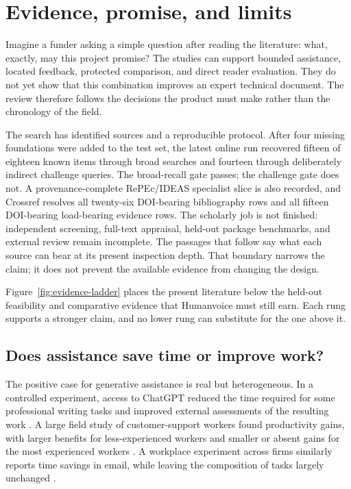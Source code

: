\chapter{Evidence, promise, and limits}
\label{ch:evidence}

Imagine a funder asking a simple question after reading the literature: what,
exactly, may this project promise? The studies can support bounded assistance,
located feedback, protected comparison, and direct reader evaluation. They do
not yet show that this combination improves an expert technical document. The
review therefore follows the decisions the product must make rather than the
chronology of the field.

The search has identified sources and a reproducible protocol. After four
missing foundations were added to the test set, the latest online run recovered
fifteen of eighteen known items through broad searches and fourteen through
deliberately indirect challenge queries. The broad-recall gate passes; the
challenge gate does not. A provenance-complete RePEc/IDEAS specialist slice is
also recorded, and Crossref resolves all twenty-six DOI-bearing bibliography
rows and all fifteen DOI-bearing load-bearing evidence rows. The scholarly job
is not finished: independent screening, full-text appraisal, held-out package
benchmarks, and external review remain incomplete. The passages that follow
say what each source can bear at its present inspection depth. That boundary
narrows the claim; it does not prevent the available evidence from changing
the design.

Figure~\ref{fig:evidence-ladder} places the present literature below the
held-out feasibility and comparative evidence that Humanvoice must still earn.
Each rung supports a stronger claim, and no lower rung can substitute for the
one above it.

\hvFigureEvidenceLadder

\section{Does assistance save time or improve work?}

The positive case for generative assistance is real but heterogeneous. In a
controlled experiment, access to ChatGPT reduced the time required for some
professional writing tasks and improved external assessments of the resulting
work \citep{noy2023experimental}. A large field study of customer-support
workers found productivity gains, with larger benefits for less-experienced
workers and smaller or absent gains for the most experienced workers
\citep{brynjolfsson2025work}. A workplace experiment across firms similarly
reports time savings in email, while leaving the composition of tasks largely
unchanged \citep{dillon2025shifting}.

